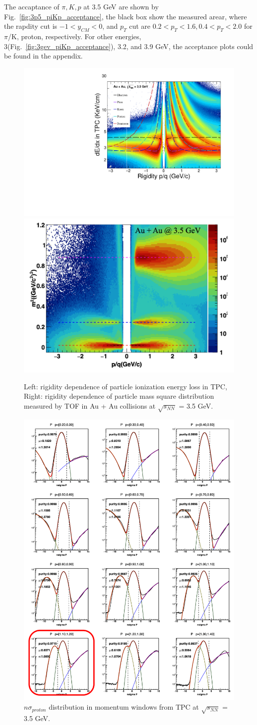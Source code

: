 The accaptance of $\pi, K, p$ at 3.5 GeV are shown by Fig.~\ref{fig:3p5_piKp_acceptance}, the black box show the measured arear, where the rapdity cut is $-1<y_{CM}<0$, 
and $p_T$ cut are $0.2<p_T<1.6, 0.4<p_T<2.0$ for $\pi$/K, proton, respectively. For other energies, 3(Fig.~\ref{fig:3gev_piKp_acceptance}), 3.2, and 3.9 GeV, the acceptance plots could be found in the appendix. 

\begin{figure}[hbt!]
\centering
\includegraphics[width=0.35\linewidth]{figures/chapter02/3p5GeV_dEdx_P23id.pdf}
\includegraphics[width=0.35\linewidth]{figures/chapter02/m2_3p5gev.png}
\caption{Left: rigidity dependence of particle ionization energy loss in TPC, Right: rigidity dependence of particle mass square distribution measured by TOF in Au + Au collisions at $\sqrt{s_{NN}}$ = 3.5 GeV.}
\label{fig:dedx_m2}
\end{figure}

\begin{figure}[hbt!]
\centering
\includegraphics[width=0.55\linewidth]{figures/chapter02/nsigmaproton_3p5gev.png}
\caption{$n\sigma_{proton}$ distribution in momentum windows from TPC at $\sqrt{s_{NN}}$ = 3.5 GeV.}
\label{fig:nsigmaproton_3p5}
\end{figure}


